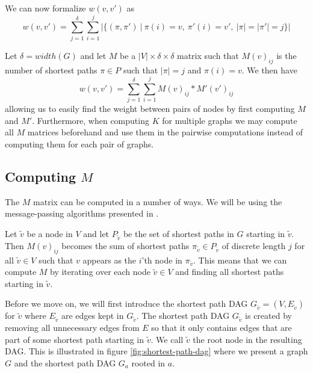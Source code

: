 \documentclass{article}
\begin{document}
We can now formalize $w(v,v')$ as
\begin{equation}
w(v,v')=\sum_{j=1}^{\delta}\sum_{i=1}^{j}|\{(\pi, \pi')\ |\ \pi(i)=v,\ \pi'(i)=v',\ |\pi|=|\pi'|=j\}|
\end{equation}


Let $\delta=width(G)$ and let $M$ be a $|V|\times\delta\times\delta$ matrix such that $M(v)_{ij}$ is the number of shortest paths $\pi\in P$ such that $|\pi|=j$ and $\pi(i)=v$. We then have
\begin{equation}
w(v,v')=\sum_{j=1}^{\delta}\sum_{i=1}^{j}M(v)_{ij}*M'(v')_{ij}
\label{eq:wmm}
\end{equation}
allowing us to easily find the weight between pairs of nodes by first computing $M$ and $M'$. Furthermore, when computing $K$ for multiple graphs we may compute all $M$ matrices beforehand and use them in the pairwise computations instead of computing them for each pair of graphs.


\subsection{Computing $M$}
The $M$ matrix can be computed in a number of ways. We will be using the message-passing algorithms presented in \cite{graphhopper}.

Let $\tilde{v}$ be a node in $V$ and let $P_{\tilde{v}}$ be the set of shortest paths in $G$ starting in $\tilde{v}$. Then $M(v)_{ij}$ becomes the sum of shortest paths $\pi_{\tilde{v}}\in P_{\tilde{v}}$ of discrete length $j$ for all $\tilde{v}\in V$ such that $v$ appears as the $i$'th node in $\pi_{\tilde{v}}$. This means that we can compute $M$ by iterating over each node $\tilde{v}\in V$ and finding all shortest paths starting in $\tilde{v}$.

Before we move on, we will first introduce the shortest path DAG $G_{\tilde{v}}=(V, E_{\tilde{v}})$ for $\tilde{v}$ where $E_{\tilde{v}}$ are edges kept in $G_{\tilde{v}}$. The shortest path DAG $G_{\tilde{v}}$ is created by removing all unnecessary edges from $E$ so that it only contains edges that are part of some shortest path starting in $\tilde{v}$. We call $\tilde{v}$ the root node in the resulting DAG. This is illustrated in figure \ref{fig:shortest-path-dag} where we present a graph $G$ and the shortest path DAG $G_{a}$ rooted in $a$.
\end{document}
